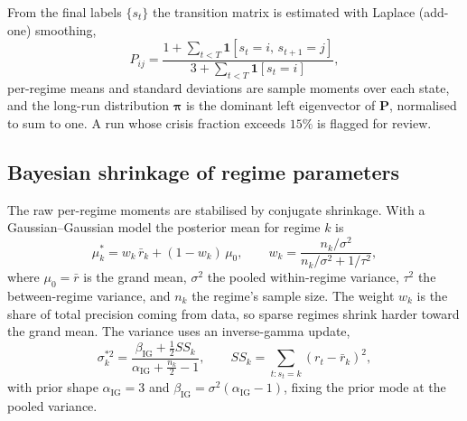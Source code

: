 \documentclass[11pt]{article}
\newcommand{\ind}{\mathbf{1}}
\theoremstyle{definition}
\begin{document}
From the final labels $\{s_t\}$ the transition matrix is estimated with Laplace
(add-one) smoothing,
\begin{equation}
  P_{ij} = \frac{1 + \sum_{t<T}\ind[s_t=i,\,s_{t+1}=j]}
                {3 + \sum_{t<T}\ind[s_t=i]},
\end{equation}
per-regime means and standard deviations are sample moments over each state, and
the long-run distribution $\boldsymbol\pi$ is the dominant left eigenvector of
$\mathbf P$, normalised to sum to one. A run whose crisis fraction exceeds $15\%$
is flagged for review.

\subsection{Bayesian shrinkage of regime parameters}
The raw per-regime moments are stabilised by conjugate shrinkage. With a
Gaussian--Gaussian model the posterior mean for regime $k$ is
\begin{equation}
  \mu_k^* = w_k\,\bar r_k + (1-w_k)\,\mu_0,
  \qquad
  w_k = \frac{n_k/\sigma^2}{n_k/\sigma^2 + 1/\tau^2},
  \label{eq:shrinkmean}
\end{equation}
where $\mu_0=\bar r$ is the grand mean, $\sigma^2$ the pooled within-regime
variance, $\tau^2$ the between-regime variance, and $n_k$ the regime's sample
size. The weight $w_k$ is the share of total precision coming from data, so
sparse regimes shrink harder toward the grand mean. The variance uses an
inverse-gamma update,
\begin{equation}
  \sigma_k^{*2} = \frac{\beta_{\mathrm{IG}} + \tfrac12 SS_k}
                       {\alpha_{\mathrm{IG}} + \tfrac{n_k}{2} - 1},
  \qquad SS_k = \sum_{t:s_t=k}(r_t-\bar r_k)^2,
\end{equation}
with prior shape $\alpha_{\mathrm{IG}}=3$ and $\beta_{\mathrm{IG}}=\sigma^2(\alpha_{\mathrm{IG}}-1)$,
fixing the prior mode at the pooled variance.
\end{document}
